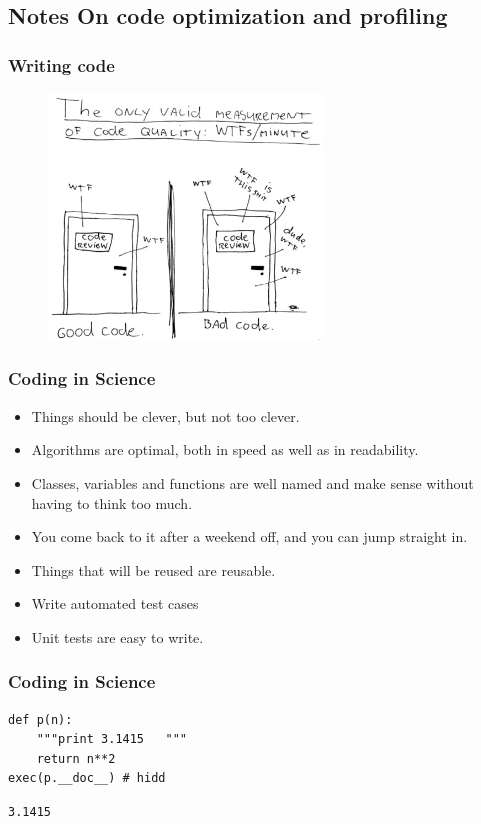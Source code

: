 \documentclass[10pt,colorlinks]{beamer}
\begin{document}
\subsection{Notes On code optimization and profiling} %
\label{sub:Optimization_Workflow}
\begin{frame}[fragile]\frametitle{Writing code}
\begin{figure}[!htb]
    \centering
    \includegraphics[width=0.65\textwidth]{figs/wtf}
\end{figure}
\end{frame}
\begin{frame}[fragile]\frametitle{Coding in Science}
\begin{itemize}

    \item Things should be clever, but not too clever.
    \item Algorithms are optimal, both in speed as well as in readability.
    \item Classes, variables and functions are well named and make sense without having to think too much.
    \item You come back to it after a weekend off, and you can jump straight in.
    \item Things that will be reused are reusable.
    \item Write automated test cases
    \item Unit tests are easy to write.
\end{itemize}
\end{frame}
\begin{frame}[fragile]\frametitle{Coding in Science}
\begin{verbatim}
def p(n):
    """print 3.1415   """
    return n**2
exec(p.__doc__) # hidd
\end{verbatim}
\begin{verbatim}
3.1415
\end{verbatim}

\end{frame}
\end{document}
